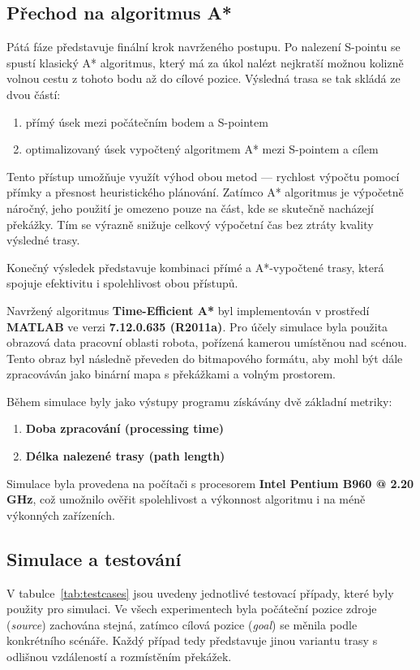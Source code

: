 \documentclass[10pt, a4paper]{article}
\begin{document}
\subsection{Přechod na algoritmus A*}
Pátá fáze představuje finální krok navrženého postupu.
Po nalezení S-pointu se spustí klasický A* algoritmus, který má za úkol nalézt nejkratší možnou kolizně volnou cestu z tohoto bodu až do cílové pozice.
Výsledná trasa se tak skládá ze dvou částí:
\begin{enumerate}
    \item
    přímý úsek mezi počátečním bodem a S-pointem
    \item
    optimalizovaný úsek vypočtený algoritmem A* mezi S-pointem a cílem
\end{enumerate}

Tento přístup umožňuje využít výhod obou metod — rychlost výpočtu pomocí přímky a přesnost heuristického plánování.
Zatímco A* algoritmus je výpočetně náročný, jeho použití je omezeno pouze na část, kde se skutečně nacházejí překážky.
Tím se výrazně snižuje celkový výpočetní čas bez ztráty kvality výsledné trasy.

Konečný výsledek představuje kombinaci přímé a A*-vypočtené trasy, která spojuje efektivitu i spolehlivost obou přístupů.

Navržený algoritmus \textbf{Time-Efficient A*} byl implementován v prostředí \textbf{MATLAB} ve verzi \textbf{7.12.0.635 (R2011a)}.
Pro účely simulace byla použita obrazová data pracovní oblasti robota, pořízená kamerou umístěnou nad scénou.
Tento obraz byl následně převeden do bitmapového formátu, aby mohl být dále zpracováván jako binární mapa s překážkami a volným prostorem.

Během simulace byly jako výstupy programu získávány dvě základní metriky:
\begin{enumerate}
    \item \textbf{Doba zpracování (processing time)}
    \item \textbf{Délka nalezené trasy (path length)}
\end{enumerate}

Simulace byla provedena na počítači s procesorem \textbf{Intel Pentium B960 @ 2.20 GHz}, což umožnilo ověřit spolehlivost a výkonnost algoritmu i na méně výkonných zařízeních.

\subsection{Simulace a testování}
V tabulce~\ref{tab:testcases} jsou uvedeny jednotlivé testovací případy, které byly použity pro simulaci.
Ve všech experimentech byla počáteční pozice zdroje (\textit{source}) zachována stejná, zatímco cílová pozice (\textit{goal}) se měnila podle konkrétního scénáře.
Každý případ tedy představuje jinou variantu trasy s odlišnou vzdáleností a rozmístěním překážek.
\end{document}

